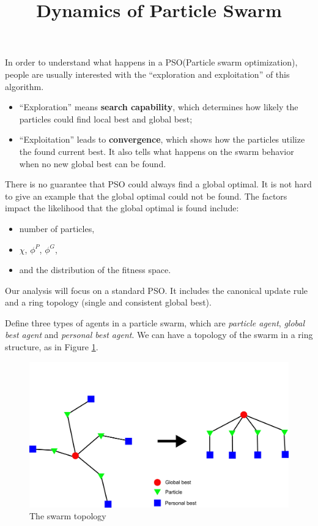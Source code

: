 \documentclass[10pt,a4paper]{article}
\begin{document}
\title{Dynamics of Particle Swarm}

\date{}

\maketitle

In order to understand what happens in a PSO(Particle swarm optimization), people are usually interested with the ``exploration and exploitation'' of this algorithm.
\begin{itemize}
\item ``Exploration'' means \textbf{search capability}, which determines how likely the particles could find local best and global best;
\item ``Exploitation'' leads to \textbf{convergence}, which shows how the particles utilize the found current best.
It also tells what happens on the swarm behavior when no new global best can be found.
\end{itemize}

There is no guarantee that PSO could always find a global optimal.
It is not hard to give an example that the global optimal could not be found. 
The factors impact the likelihood that the global optimal is found include:
\begin{itemize}
\item number of particles,
\item $ \chi $, $ \phi^{P} $, $ \phi^{G} $,
\item and the distribution of the fitness space.
\end{itemize}

Our analysis will focus on a standard PSO.
It includes the canonical update rule and a ring topology (single and consistent global best).

Define three types of agents in a particle swarm, which are \emph{particle agent}, \emph{global best agent} and \emph{personal best agent}.
We can have a topology of the swarm in a ring structure, as in Figure \ref{fig:topology3}.

\begin{figure}
\centering
\includegraphics[width=0.7\linewidth]{./topology3}
\caption{The swarm topology}
\label{fig:topology3}
\end{figure}
\end{document}
